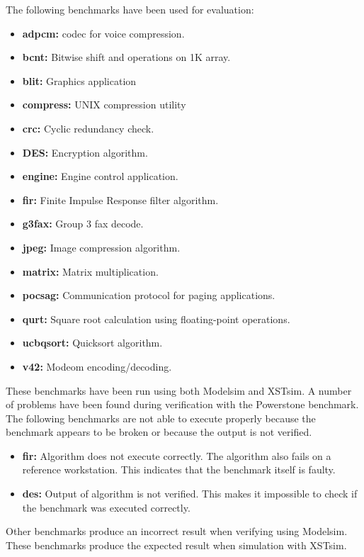 The following benchmarks have been used for evaluation:

\begin{itemize}
	\item \textbf{adpcm:} codec for voice compression.
	\item \textbf{bcnt:} Bitwise shift and operations on 1K array.
	\item \textbf{blit:} Graphics application
	\item \textbf{compress:} UNIX compression utility
	\item \textbf{crc:} Cyclic redundancy check.
	\item \textbf{DES:} Encryption algorithm.
	\item \textbf{engine:} Engine control application.
	\item \textbf{fir:} Finite Impulse Response filter algorithm.
	\item \textbf{g3fax:} Group 3 fax decode.
	\item \textbf{jpeg:} Image compression algorithm.
	\item \textbf{matrix:} Matrix multiplication.
	\item \textbf{pocsag:} Communication protocol for paging applications.
	\item \textbf{qurt:} Square root calculation using floating-point operations.
	\item \textbf{ucbqsort:} Quicksort algorithm.
	\item \textbf{v42:} Modeom encoding/decoding.
\end{itemize}

These benchmarks have been run using both Modelsim and XSTsim. A number of problems have been found during verification with the Powerstone benchmark. The following benchmarks are not able to execute properly because the benchmark appears to be broken or because the output is not verified.

\begin{itemize}
	\item \textbf{fir:} Algorithm does not execute correctly. The algorithm also fails on a reference workstation. This indicates that the benchmark itself is faulty.
	\item \textbf{des:} Output of algorithm is not verified. This makes it impossible to check if the benchmark was executed correctly.
\end{itemize}

Other benchmarks produce an incorrect result when verifying using Modelsim. These benchmarks produce the expected result when simulation with XSTsim.

